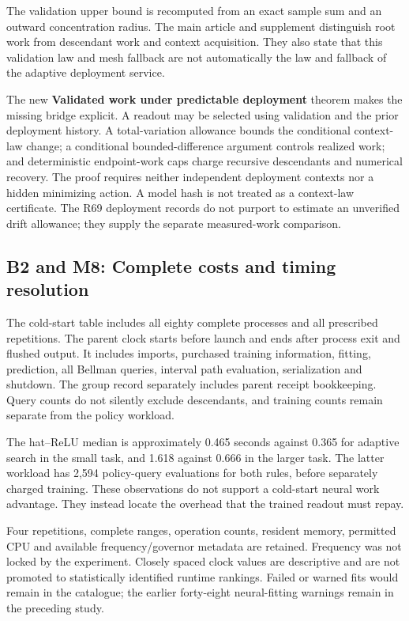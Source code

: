 The validation upper bound is recomputed from an exact sample sum and an
outward concentration radius. The main article and supplement
distinguish root work from descendant work and context acquisition. They
also state that this validation law and mesh fallback are not
automatically the law and fallback of the adaptive deployment service.

The new \textbf{Validated work under predictable deployment} theorem
makes the missing bridge explicit. A readout may be selected using
validation and the prior deployment history. A total-variation allowance
bounds the conditional context-law change; a conditional
bounded-difference argument controls realized work; and deterministic
endpoint-work caps charge recursive descendants and numerical recovery.
The proof requires neither independent deployment contexts nor a hidden
minimizing action. A model hash is not treated as a context-law
certificate. The R69 deployment records do not purport to estimate an
unverified drift allowance; they supply the separate measured-work
comparison.

\hypertarget{b2-and-m8-complete-costs-and-timing-resolution}{%
\subsection{B2 and M8: Complete costs and timing
resolution}\label{b2-and-m8-complete-costs-and-timing-resolution}}

The cold-start table includes all eighty complete processes and all
prescribed repetitions. The parent clock starts before launch and ends
after process exit and flushed output. It includes imports, purchased
training information, fitting, prediction, all Bellman queries, interval
path evaluation, serialization and shutdown. The group record separately
includes parent receipt bookkeeping. Query counts do not silently
exclude descendants, and training counts remain separate from the policy
workload.

The hat--ReLU median is approximately 0.465 seconds against 0.365 for
adaptive search in the small task, and 1.618 against 0.666 in the larger
task. The latter workload has 2,594 policy-query evaluations for both
rules, before separately charged training. These observations do not
support a cold-start neural work advantage. They instead locate the
overhead that the trained readout must repay.

Four repetitions, complete ranges, operation counts, resident memory,
permitted CPU and available frequency/governor metadata are retained.
Frequency was not locked by the experiment. Closely spaced clock values
are descriptive and are not promoted to statistically identified runtime
rankings. Failed or warned fits would remain in the catalogue; the
earlier forty-eight neural-fitting warnings remain in the preceding
study.

